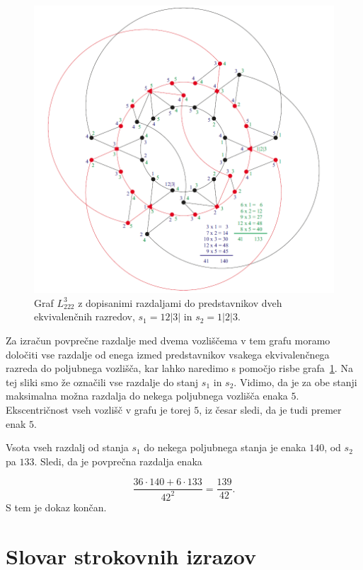 \documentclass[12pt,a4paper]{amsart}
\theoremstyle{definition} %
\theoremstyle{plain} %
\begin{document}
    \begin{figure}[h]
        \includegraphics[width=400pt]{img/graph-L^3_222.png}
        \caption{Graf $L^3_{222}$ z dopisanimi razdaljami do predstavnikov dveh ekvivalenčnih razredov, $s_1=12|3|$ in $s_2 = 1|2|3$.}
        \label{fig:L^3_222}
    \end{figure}
    
    Za izračun povprečne razdalje med dvema vozliščema v tem grafu moramo določiti vse razdalje od enega izmed predstavnikov vsakega ekvivalenčnega razreda do poljubnega vozlišča, kar lahko naredimo s pomočjo risbe grafa~\ref{fig:L^3_222}. Na tej sliki smo že označili vse razdalje do stanj $s_1$ in $s_2$. Vidimo, da je za obe stanji maksimalna možna razdalja do nekega poljubnega vozlišča enaka $5$. Ekscentričnost vseh vozlišč v grafu je torej $5$, iz česar sledi, da je tudi premer enak $5$. 
    
    Vsota vseh razdalj od stanja $s_1$ do nekega poljubnega stanja je enaka $140$, od $s_2$ pa $133$. Sledi, da je povprečna razdalja enaka
    
    \[ \frac{36 \cdot 140 + 6 \cdot 133}{{42}^2} = \frac{139}{42} .\]
    S tem je dokaz končan.
\endproof
\clearpage
\section*{Slovar strokovnih izrazov}
\end{document}
